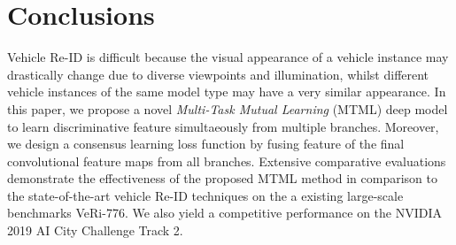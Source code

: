 \documentclass[10pt,twocolumn,letterpaper]{article}
\begin{document}
%

\section{Conclusions}
Vehicle Re-ID is difficult because the visual appearance of
a vehicle instance may drastically change due to diverse
viewpoints and illumination, whilst different vehicle instances of the same
model type may have a very similar appearance.
%
In this paper, we propose a novel {\em Multi-Task Mutual Learning} (MTML) deep model
to learn discriminative feature simultaeously from multiple branches.
%
Moreover, we design a consensus learning loss function by fusing feature of the final convolutional feature maps from all branches.
%
Extensive comparative evaluations demonstrate the effectiveness of the
proposed MTML method in comparison to the state-of-the-art vehicle Re-ID techniques on the a existing large-scale benchmarks VeRi-776.
We also yield a competitive performance on the NVIDIA 2019 AI City Challenge Track 2.

{\small


}
\end{document}
